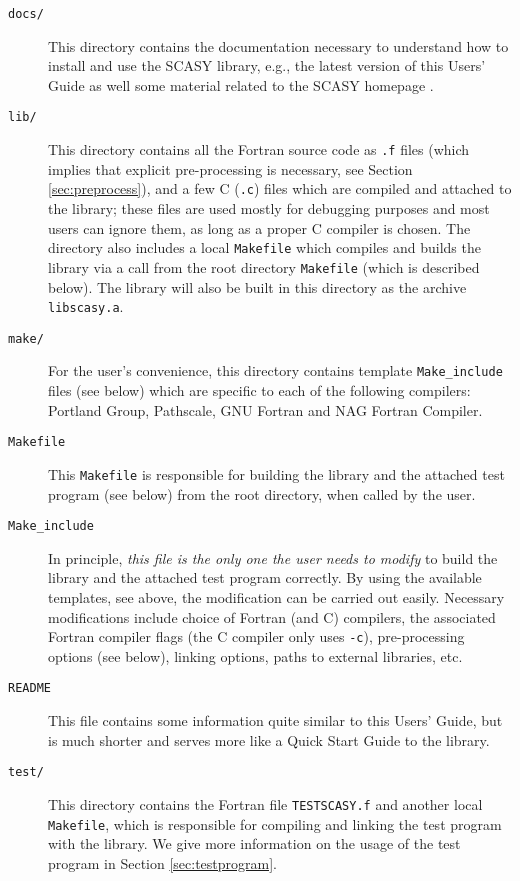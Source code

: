 \documentclass[11pt]{article}
\begin{document}
\begin{description}
    \item[\texttt{docs/}] This directory contains the
    documentation necessary to understand how to install and use
    the SCASY library, e.g., the latest version of this Users'
    Guide \cite{sug} as well some material related to the SCASY
    homepage \cite{scasy}.
    \item[\texttt{lib/}] This directory contains all the Fortran
    source code as \texttt{.f} files (which implies that explicit
    pre-processing is necessary, see Section
    \ref{sec:preprocess}), and a few C (\texttt{.c}) files which are
    compiled and attached
    to the library; these files are used mostly for debugging purposes
    and most users can ignore them, as long as a proper C compiler
    is chosen. The directory also includes a local
    \texttt{Makefile} which compiles and builds the library via a
    call from the root directory \texttt{Makefile} (which is described
    below). The library will also be built in this directory as the archive \texttt{libscasy.a}.
    \item[\texttt{make/}] For the user's convenience, this directory contains
    template \texttt{Make\_include} files (see below) which are specific to each of the
    following compilers: Portland Group, Pathscale, GNU Fortran
    and NAG Fortran Compiler.
    \item[\texttt{Makefile}] This \texttt{Makefile} is responsible
    for building the library and the attached test program (see
    below) from the root directory, when called by the user.
    \item[\texttt{Make\_include}] In principle, \emph{this file is the
    only one the user needs to modify} to build the library and the
    attached test program correctly. By using the available
    templates, see above, the modification can be carried out
    easily. Necessary modifications include choice of Fortran (and C) compilers,
    the associated Fortran compiler flags (the C compiler only uses \texttt{-c}),
    pre-processing options (see below), linking options, paths to external libraries, etc.
    \item[\texttt{README}] This file contains some information
    quite similar to this Users' Guide, but is much shorter and
    serves more like a Quick Start Guide to the library.
    \item[\texttt{test/}] This directory contains the Fortran file
    \texttt{TESTSCASY.f} and another local \texttt{Makefile},
    which is responsible for compiling and linking the test
    program with the library. We give more information on the
    usage of the test program in Section \ref{sec:testprogram}.
\end{description}
\end{document}
